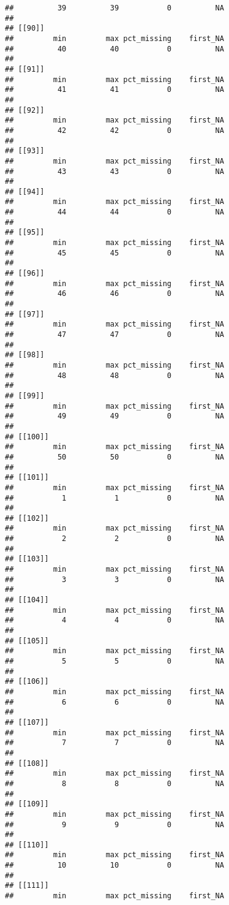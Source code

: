 \documentclass[
]{article}
\begin{document}
\begin{verbatim}
##          39          39           0          NA 
## 
## [[90]]
##         min         max pct_missing    first_NA 
##          40          40           0          NA 
## 
## [[91]]
##         min         max pct_missing    first_NA 
##          41          41           0          NA 
## 
## [[92]]
##         min         max pct_missing    first_NA 
##          42          42           0          NA 
## 
## [[93]]
##         min         max pct_missing    first_NA 
##          43          43           0          NA 
## 
## [[94]]
##         min         max pct_missing    first_NA 
##          44          44           0          NA 
## 
## [[95]]
##         min         max pct_missing    first_NA 
##          45          45           0          NA 
## 
## [[96]]
##         min         max pct_missing    first_NA 
##          46          46           0          NA 
## 
## [[97]]
##         min         max pct_missing    first_NA 
##          47          47           0          NA 
## 
## [[98]]
##         min         max pct_missing    first_NA 
##          48          48           0          NA 
## 
## [[99]]
##         min         max pct_missing    first_NA 
##          49          49           0          NA 
## 
## [[100]]
##         min         max pct_missing    first_NA 
##          50          50           0          NA 
## 
## [[101]]
##         min         max pct_missing    first_NA 
##           1           1           0          NA 
## 
## [[102]]
##         min         max pct_missing    first_NA 
##           2           2           0          NA 
## 
## [[103]]
##         min         max pct_missing    first_NA 
##           3           3           0          NA 
## 
## [[104]]
##         min         max pct_missing    first_NA 
##           4           4           0          NA 
## 
## [[105]]
##         min         max pct_missing    first_NA 
##           5           5           0          NA 
## 
## [[106]]
##         min         max pct_missing    first_NA 
##           6           6           0          NA 
## 
## [[107]]
##         min         max pct_missing    first_NA 
##           7           7           0          NA 
## 
## [[108]]
##         min         max pct_missing    first_NA 
##           8           8           0          NA 
## 
## [[109]]
##         min         max pct_missing    first_NA 
##           9           9           0          NA 
## 
## [[110]]
##         min         max pct_missing    first_NA 
##          10          10           0          NA 
## 
## [[111]]
##         min         max pct_missing    first_NA 

\end{verbatim}
\end{document}
